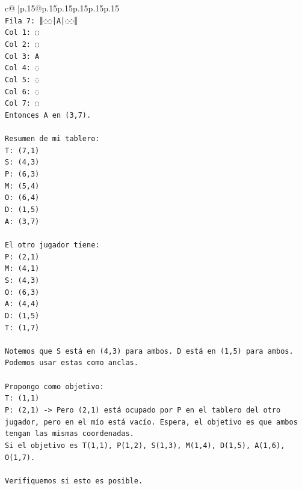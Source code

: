 \documentclass{article}
\begin{document}
{\begin{supertabular}{c@{$\;$}|p{.15\linewidth}@{}p{.15\linewidth}p{.15\linewidth}p{.15\linewidth}p{.15\linewidth}p{.15\linewidth}}
{{{\\ 
\texttt{Fila 7: ║◌◌│A│◌◌║} \\
\texttt{Col 1: ◌} \\
\texttt{Col 2: ◌} \\
\texttt{Col 3: A} \\
\texttt{Col 4: ◌} \\
\texttt{Col 5: ◌} \\
\texttt{Col 6: ◌} \\
\texttt{Col 7: ◌} \\
\texttt{Entonces A en (3,7).} \\
\\ 
\texttt{Resumen de mi tablero:} \\
\texttt{T: (7,1)} \\
\texttt{S: (4,3)} \\
\texttt{P: (6,3)} \\
\texttt{M: (5,4)} \\
\texttt{O: (6,4)} \\
\texttt{D: (1,5)} \\
\texttt{A: (3,7)} \\
\\ 
\texttt{El otro jugador tiene:} \\
\texttt{P: (2,1)} \\
\texttt{M: (4,1)} \\
\texttt{S: (4,3)} \\
\texttt{O: (6,3)} \\
\texttt{A: (4,4)} \\
\texttt{D: (1,5)} \\
\texttt{T: (1,7)} \\
\\ 
\texttt{Notemos que S está en (4,3) para ambos. D está en (1,5) para ambos.} \\
\texttt{Podemos usar estas como anclas.} \\
\\ 
\texttt{Propongo como objetivo:} \\
\texttt{T: (1,1)} \\
\texttt{P: (2,1) {-}> Pero (2,1) está ocupado por P en el tablero del otro jugador, pero en el mío está vacío. Espera, el objetivo es que ambos tengan las mismas coordenadas.} \\
\texttt{Si el objetivo es T(1,1), P(1,2), S(1,3), M(1,4), D(1,5), A(1,6), O(1,7).} \\
\\ 
\texttt{Verifiquemos si esto es posible.} \\
}}}
\end{supertabular}}
\end{document}
